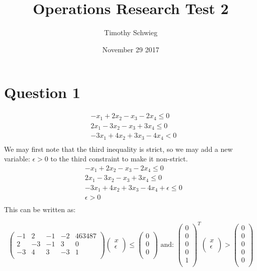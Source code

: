 \documentclass[10pt, letterpaper]{paper}
\title{ Operations Research Test 2 }
\author{ Timothy Schwieg }
\date{ November 29 2017 }
\begin{document}
\maketitle

\section*{Question 1 }
\begin{align*}
&-x_1 + 2x_2 -x_3 - 2x_4 \leq 0\\
&2x_1 - 3x_2 -x_3 + 3x_4 \leq 0\\
&-3x_1 +4x_2 + 3x_3 - 4x_4 < 0\\
\end{align*}
We may first note that the third inequality is strict, so we may add a new variable: $\epsilon > 0$ to the third constraint to make it non-strict.
\begin{align*}
&-x_1 + 2x_2 -x_3 - 2x_4 \leq 0\\
&2x_1 - 3x_2 -x_3 + 3x_4 \leq 0\\
&-3x_1 +4x_2 + 3x_3 - 4x_4 + \epsilon \leq 0\\
&\epsilon > 0\\
\end{align*}
This can be written as:

\[ \left ( { \begin{array}{ccccc}
	-1 & 2 & -1 & -2 & 463487 \\
	2 & -3 & -1& 3 & 0\\
	-3 & 4 & 3 & -3 & 1\\
	\end{array}}\right) 
	\left( { \begin{array}{c}
	x\\
	\epsilon\\
	\end{array}} \right )
	\leq \left( { \begin{array}{c}
	0\\
	0\\
	0\\
	\end{array}} \right ) \text{ and: } \left( { \begin{array}{c}
	0\\
	0\\
	0\\
	0\\
	1\\
	\end{array}} \right)^T 
	\left( { \begin{array}{c}
	x\\
	\epsilon\\
	\end{array}} \right ) > \left( { \begin{array}{c}
	0\\
	0\\
	0\\
	0\\
	0\\
	\end{array}}\right ) \]
	
\end{document}
